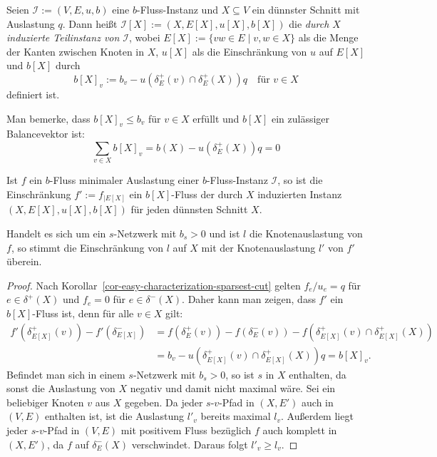 \begin{definition}
	Seien $\mathcal{I}:=(V, E, u, b)$ eine $b$-Fluss-Instanz und $X\subseteq V$ ein dünnster Schnitt mit Auslastung $q$.
	Dann heißt $\mathcal{I}[X] := (X, E[X], u[X], b[X])$ die \emph{durch $X$ induzierte Teilinstanz von $\mathcal{I}$},
	wobei $E[X] := \{ vw \in E \mid v, w \in X \}$ als die Menge der Kanten zwischen Knoten in $X$, $u[X]$ als die Einschränkung von $u$ auf $E[X]$ und $b[X]$ durch \[
	b[X]_v := b_v - u(\delta^+_E(v)\cap\delta^+_E(X)) q \quad \text{für $v\in X$}
\] definiert ist.
\end{definition}

Man bemerke, dass $b[X]_v \leq b_v$ für $v\in X$ erfüllt und $b[X]$ ein zulässiger Balancevektor ist: \[
	\sum_{v\in X} b[X]_v = b(X) - u(\delta^+_E(X)) q = 0
\]

\begin{proposition}\label{prop-restricted-minimal-flow-is-b-flow-on-induced-instance}
	Ist $f$ ein $b$-Fluss minimaler Auslastung einer $b$-Fluss-Instanz $\mathcal{I}$, so ist die Einschränkung $f':=f_{\mid E[X]}$ ein $b[X]$-Fluss der durch $X$ induzierten Instanz $(X, E[X], u[X], b[X])$ für jeden dünnsten Schnitt $X$.
	
	Handelt es sich um ein $s$-Netzwerk mit $b_s > 0$ und ist $l$ die Knotenauslastung von $f$, so stimmt die Einschränkung von $l$ auf $X$ mit der Knotenauslastung $l'$ von $f'$ überein.
\end{proposition}
\begin{proof}
	Nach Korollar~\ref{cor-easy-characterization-sparsest-cut} gelten $f_{e}/u_{e}=q$ für $e\in\delta^+(X)$ und $f_{e} = 0$ für $e\in\delta^-(X)$.
	Daher kann man zeigen, dass $f'$ ein $b[X]$-Fluss ist, denn für alle $v\in X$ gilt:
	\begin{align*}
	f'(\delta^+_{E[X]}(v)) - f'(\delta^-_{E[X]}) &= f(\delta^+_E(v)) - f(\delta^-_E(v)) - f(\delta^+_{E[X]}(v)\cap\delta^+_{E[X]}(X)) \\
	&= b_v - u(\delta^+_{E[X]}(v)\cap\delta^+_{E[X]}(X))q = b[X]_v.
	\end{align*}
	Befindet man sich in einem $s$-Netzwerk mit $b_s > 0$, so ist $s$ in $X$ enthalten, da sonst die Auslastung von $X$ negativ und damit nicht maximal wäre.
	Sei ein beliebiger Knoten $v$ aus $X$ gegeben.
	Da jeder $s$-$v$-Pfad in $(X, E')$ auch in $(V, E)$ enthalten ist, ist die Auslastung $l'_v$ bereits maximal $l_v$.
	Außerdem liegt jeder $s$-$v$-Pfad in $(V, E)$ mit positivem Fluss bezüglich $f$ auch komplett in $(X, E')$, da $f$ auf $\delta^-_E(X)$ verschwindet.
	Daraus folgt $l'_v \geq l_v$.
\end{proof}


